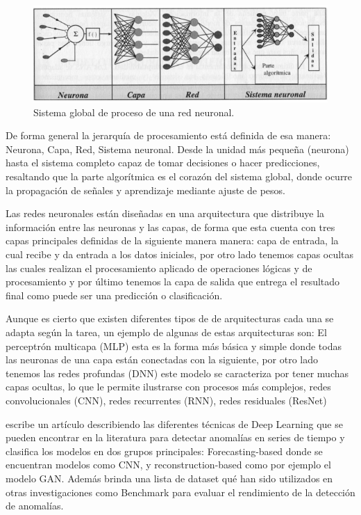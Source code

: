 \documentclass[11pt,a4paper,spanish]{book}
\numberwithin{equation}{chapter}
\numberwithin{figure}{chapter}
\begin{document}
\begin{figure}[h]
    \centering
    \includegraphics[width=1.0\textwidth]{media/sistema-neuronal.png}
    \caption{Sistema global de proceso de una red neuronal.  \protect\cite{larranaga2021redes} }
    \label{fig:figSistemaNeuronal}
\end{figure}



De forma general la jerarquía de procesamiento está definida de esa manera: Neurona, Capa, Red, Sistema neuronal. Desde la unidad más pequeña (neurona) hasta el sistema completo capaz de tomar decisiones o hacer predicciones, resaltando que la parte algorítmica es el corazón del sistema global, donde ocurre la propagación de señales y aprendizaje mediante ajuste de pesos. \cite{larranaga2021redes}


Las redes neuronales están diseñadas en una arquitectura que distribuye la información entre las neuronas y las capas, de forma que esta cuenta con tres capas principales definidas de la siguiente manera manera: capa de entrada, la cual recibe y da entrada a los datos iniciales, por otro lado tenemos capas ocultas las cuales realizan el procesamiento aplicado de operaciones lógicas y de procesamiento y por último tenemos la capa de salida que entrega el resultado final como puede ser una predicción o clasificación. \cite{larranaga2021redes} 

Aunque es cierto que existen diferentes tipos de de arquitecturas cada una se adapta según la tarea, un ejemplo de algunas de estas arquitecturas son: El perceptrón multicapa (MLP) esta es la forma más básica y simple donde todas las neuronas de una capa están conectadas con la siguiente, por otro lado tenemos las redes profundas (DNN) este modelo se caracteriza por tener muchas capas ocultas, lo que le permite ilustrarse con procesos más complejos, redes convolucionales (CNN), redes recurrentes (RNN), redes residuales (ResNet)


\cite{Zamanzadeh_Darban_2024} escribe un artículo describiendo las diferentes técnicas de Deep Learning que se pueden encontrar en la literatura para detectar anomalías en series de tiempo y clasifica los modelos en dos grupos principales: Forecasting-based donde se encuentran modelos como CNN, y reconstruction-based como por ejemplo el modelo GAN. Además brinda una lista de dataset qué han sido utilizados en otras investigaciones como Benchmark para evaluar el rendimiento de la detección de anomalías.
\end{document}
